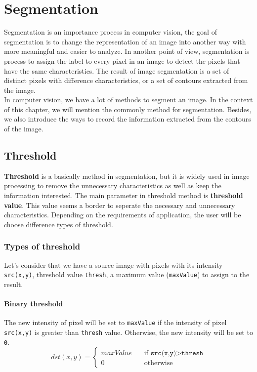 \chapter{Segmentation}
Segmentation is an importance process in computer vision, the goal of segmentation is to change the representation of an image into another way with more meaningful and easier to analyze. In another point of view, segmentation is process to assign the label to every pixel in an image to detect the pixels that have the same characteristics. The result of image segmentation is a set of distinct pixels with difference characteristics, or a set of contours extracted from the image.\\[0.2cm]
In computer vision, we have a lot of methods to segment an image. In the context of this chapter, we will mention the commonly method for segmentation. Besides, we also introduce the ways to record the information extracted from the contours of the image.
\section{Threshold}
\textbf{Threshold} is a basically method in segmentation, but it is widely used in image processing to remove the unnecessary characteristics as well as keep the information interested. The main parameter in threshold method is \textbf{threshold value}. This value seems a border to seperate the necessary and unnecessary characteristics. Depending on the requirements of application, the user will be choose difference types of threshold.\\[0.2cm]  
\subsection{Types of threshold}
Let's consider that we have a source image with pixels with its intensity \texttt{src(x,y)}, threshold value \texttt{thresh}, a maximum value (\texttt{maxValue}) to assign to the result. 
\subsubsection{Binary threshold}
The new intensity of pixel will be set to \texttt{maxValue} if the intensity of pixel \texttt{src(x,y)} is greater than \texttt{thresh} value. Otherwise, the new intensity will be set to \texttt{0}.
\begin{equation}	
		dst(x,y) = 
		\begin{cases}
			maxValue & \quad \text{if }\texttt{src(x,y)} > \texttt{thresh} \\
			0 & \quad \text{otherwise}
		\end{cases}	
\end{equation}
